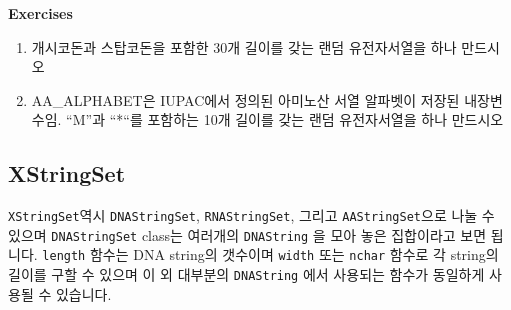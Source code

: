 \documentclass[
]{book}
\begin{document}
\textbf{Exercises }

\begin{enumerate}
\def\labelenumi{\arabic{enumi}.}
\item
  개시코돈과 스탑코돈을 포함한 30개 길이를 갖는 랜덤 유전자서열을 하나 만드시오
\item
  AA\_ALPHABET은 IUPAC에서 정의된 아미노산 서열 알파벳이 저장된 내장변수임. ``M''과 ``*``를 포함하는 10개 길이를 갖는 랜덤 유전자서열을 하나 만드시오
\end{enumerate}

\hypertarget{xstringset}{%
\subsection{XStringSet}\label{xstringset}}

\texttt{XStringSet}역시 \texttt{DNAStringSet}, \texttt{RNAStringSet}, 그리고 \texttt{AAStringSet}으로 나눌 수 있으며 \texttt{DNAStringSet} class는 여러개의 \texttt{DNAString} 을 모아 놓은 집합이라고 보면 됩니다. \texttt{length} 함수는 DNA string의 갯수이며 \texttt{width} 또는 \texttt{nchar} 함수로 각 string의 길이를 구할 수 있으며 이 외 대부분의 \texttt{DNAString} 에서 사용되는 함수가 동일하게 사용될 수 있습니다.
\end{document}
